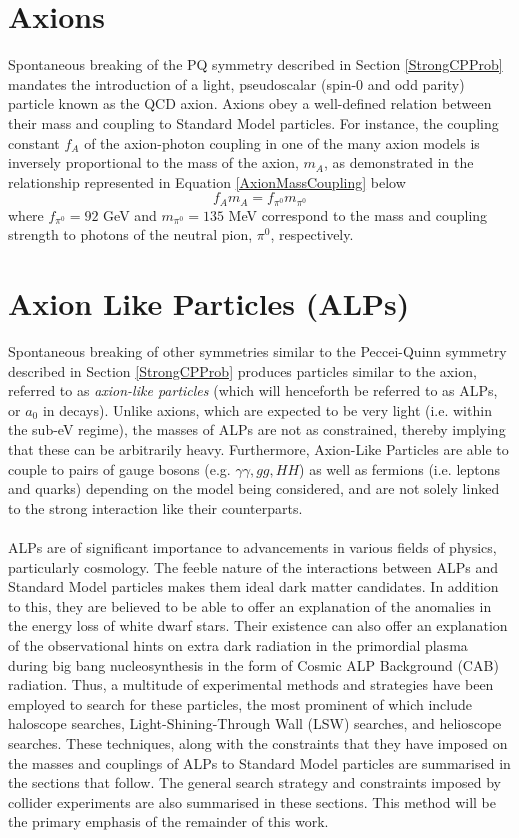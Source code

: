 \section{Axions}
Spontaneous breaking of the PQ symmetry described in Section \ref{StrongCPProb} mandates the introduction of a light, pseudoscalar (spin-0 and odd parity) particle known as the QCD axion. Axions obey a well-defined relation between their mass and coupling
to Standard Model particles. For instance, the coupling constant $f_{A}$ of the axion-photon coupling in one of the many axion models is inversely proportional to the mass of the axion, $m_{A}$, as demonstrated in the relationship represented in Equation \ref{AxionMassCoupling} below
\begin{equation}\label{AxionMassCoupling}
    f_{A}m_{A} = f_{\pi^{0}}m_{\pi^{0}}
\end{equation}
where $f_{\pi^{0}} = 92$ GeV and $m_{\pi^{0}} = 135$ MeV correspond to the mass and coupling strength to photons of the neutral pion, $\pi^{0}$, respectively.
\section{Axion Like Particles (ALPs)}
Spontaneous breaking of other symmetries similar to the Peccei-Quinn symmetry described in Section \ref{StrongCPProb} produces particles similar to the axion, referred to as \textit{axion-like particles} (which will henceforth be referred to as ALPs, or $a_{0}$ in decays). Unlike axions, which are expected to be very light (i.e. within the sub-eV regime), the masses of ALPs 
are not as constrained, thereby implying that these can be arbitrarily heavy. Furthermore, Axion-Like Particles are able to couple to pairs of
gauge bosons (e.g. $\gamma\gamma, gg, HH$) as well as fermions (i.e. leptons and quarks) depending on the model being considered, and are not solely linked to the strong interaction like their
counterparts. \\
\\
ALPs are of significant importance to advancements in various fields of physics, particularly cosmology. The feeble nature of the interactions between ALPs and Standard Model particles makes them ideal dark matter candidates. In addition to this, they
are believed to be able to offer an explanation of the anomalies in the energy loss of white dwarf stars. Their existence can also offer an explanation of the observational hints on extra dark radiation in the primordial plasma during big bang nucleosynthesis in the form
of Cosmic ALP Background (CAB) radiation. Thus, a multitude of experimental methods and strategies have been employed to search for these particles, the most prominent of which include haloscope searches, Light-Shining-Through Wall (LSW) searches, and helioscope searches. These
techniques, along with the constraints that they have imposed on the masses and couplings of ALPs to Standard Model particles are summarised in the sections that follow. The general search strategy and constraints imposed by collider experiments are also summarised in these sections. This
method will be the primary emphasis of the remainder of this work. 
